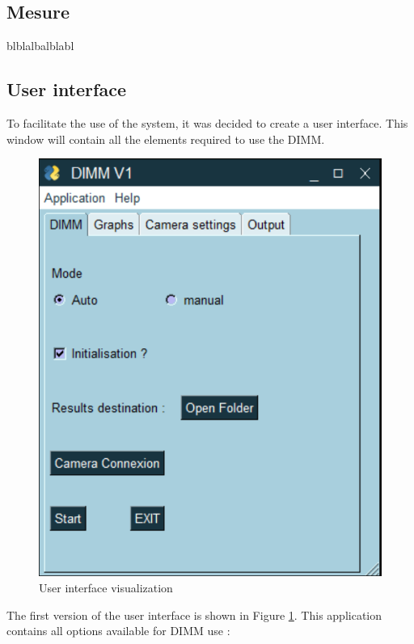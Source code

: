 \subsection{Mesure}
blblalbalblabl
\newpage
\subsection{User interface}
To facilitate the use of the system, it was decided to create a user interface.
This window will contain all the elements required to use the DIMM.
\begin{figure}[H]
    \centering
    \includegraphics[scale=0.85]{assets/figures/Software/GUI1.png}
    \caption{User interface visualization}
    \label{fig:Soft_GUI}
\end{figure}
The first version of the user interface is shown in Figure \ref{fig:Soft_GUI}.
This application contains all options available for DIMM use :
